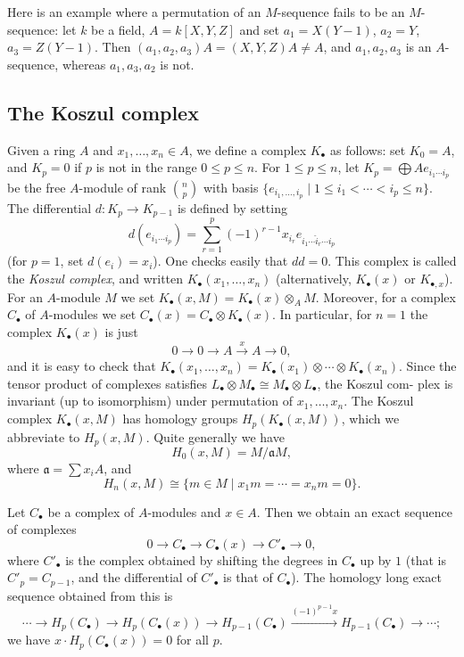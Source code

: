 Here is an example where a permutation of an $M$-sequence fails to be
an $M$-sequence: let $k$ be a field, $A = k[X, Y, Z]$ and set $a_1 = X(Y - 1)$,
$a_2 = Y$, $a_3 = Z(Y - 1)$. Then $(a_1, a_2, a_3)A = (X, Y, Z)A \neq A$, and $a_1, a_2, a_3$
is an $A$-sequence, whereas $a_1, a_3, a_2$ is not.

\subsection*{The Koszul complex}

Given a ring $A$ and $x_1, \ldots, x_n \in A$, we define a complex $K_\bullet$ as follows:
set $K_0 = A$, and $K_p = 0$ if $p$ is not in the range $0 \le p \le n$. For $1 \le p \le n$,
let $K_p = \bigoplus A e_{i_1 \cdots i_p}$ be the free $A$-module of rank $\binom{n}{p}$ with basis
$\{e_{i_1, \ldots, i_p} \mid 1 \le i_1 < \cdots < i_p \le n\}$. The differential $d\colon K_p \to K_{p-1}$ is defined
by setting
\[
  d(e_{i_1 \cdots i_p}) = \sum_{r=1}^{p} (-1)^{r-1}x_{i_r}e_{i_1 \cdots \hat{i}_r \cdots i_p}
\]
(for $p = 1$, set $d(e_i) = x_i$). One checks easily that $dd = 0$. This complex is
called the \emph{Koszul complex}, and written $K_\bullet(x_1, \ldots, x_n)$ (alternatively,
$K_\bullet(x)$ or $K_{\bullet, x}$). For an $A$-module $M$ we set $K_\bullet(x, M) = K_\bullet(x) \otimes_A M$.
Moreover, for a complex $C_\bullet$ of $A$-modules we set $C_\bullet(x) = C_\bullet \otimes K_\bullet(x)$. In
particular, for $n = 1$ the complex $K_\bullet(x)$ is just
\[
  0 \to 0 \to A \xrightarrow{x} A \to 0,
\]
and it is easy to check that $K_\bullet(x_1, \ldots, x_n) = K_\bullet(x_1) \otimes \cdots \otimes K_\bullet(x_n)$. Since the
tensor product of complexes satisfies $L_\bullet \otimes M_\bullet \cong M_\bullet \otimes L_\bullet$, the Koszul com-
plex is invariant (up to isomorphism) under permutation of $x_1, \ldots, x_n$. The
Koszul complex $K_\bullet(x, M)$ has homology groups $H_p(K_\bullet(x, M))$, which we
abbreviate to $H_p(x, M)$. Quite generally we have
\[
  H_0(x, M) = M/\mathfrak{a}M,
\]
where $\mathfrak{a} = \sum x_iA$, and
\[
  H_n(x, M) \cong \{m \in M \mid x_1m = \cdots = x_nm = 0\}.
\]

\begin{theorem}\label{thm:16.4}
Let $C_\bullet$ be a complex of $A$-modules and $x \in A$. Then we obtain
an exact sequence of complexes
\[
  0 \to C_\bullet \to C_\bullet(x) \to C'_\bullet \to 0,
\]
where $C'_\bullet$ is the complex obtained by shifting the degrees in $C_\bullet$ up by $1$ (that is
$C'_p = C_{p-1}$, and the differential of $C'_\bullet$ is that of $C_\bullet$). The homology long
exact sequence obtained from this is
\[
  \cdots \to H_p(C_\bullet) \to H_p(C_\bullet(x)) \to H_{p-1}(C_\bullet) \xrightarrow{(-1)^{p-1}x}
  H_{p-1}(C_\bullet) \to \cdots;
\]
we have $x \cdot H_p(C_\bullet(x)) = 0$ for all $p$.
\end{theorem}


